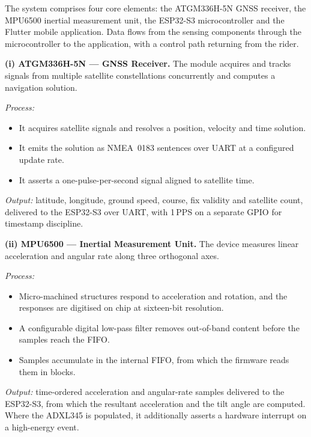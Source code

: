 \documentclass[12pt,a4paper,oneside]{report}
\begin{document}
The system comprises four core elements: the ATGM336H-5N GNSS receiver, the MPU6500 inertial
measurement unit, the ESP32-S3 microcontroller and the Flutter mobile application. Data
flows from the sensing components through the microcontroller to the application, with a
control path returning from the rider.

\vspace{0.5em}
\noindent\textbf{(i) ATGM336H-5N --- GNSS Receiver.} The module acquires and tracks signals
from multiple satellite constellations concurrently and computes a navigation solution.

\noindent\emph{Process:}
\begin{itemize}[leftmargin=*,itemsep=0.28em,topsep=0.4em]
\item It acquires satellite signals and resolves a position, velocity and time solution.
\item It emits the solution as NMEA~0183 sentences over UART at a configured update rate.
\item It asserts a one-pulse-per-second signal aligned to satellite time.
\end{itemize}
\noindent\emph{Output:} latitude, longitude, ground speed, course, fix validity and
satellite count, delivered to the ESP32-S3 over UART, with 1\,PPS on a separate GPIO for
timestamp discipline.

\vspace{0.5em}
\noindent\textbf{(ii) MPU6500 --- Inertial Measurement Unit.} The device measures linear
acceleration and angular rate along three orthogonal axes.

\noindent\emph{Process:}
\begin{itemize}[leftmargin=*,itemsep=0.28em,topsep=0.4em]
\item Micro-machined structures respond to acceleration and rotation, and the responses are
digitised on chip at sixteen-bit resolution.
\item A configurable digital low-pass filter removes out-of-band content before the samples
reach the FIFO.
\item Samples accumulate in the internal FIFO, from which the firmware reads them in blocks.
\end{itemize}
\noindent\emph{Output:} time-ordered acceleration and angular-rate samples delivered to the
ESP32-S3, from which the resultant acceleration and the tilt angle are computed. Where the
ADXL345 is populated, it additionally asserts a hardware interrupt on a high-energy event.
\end{document}
